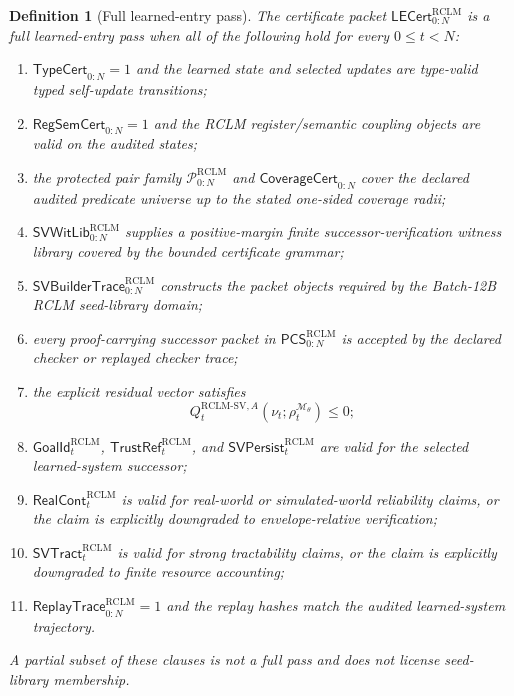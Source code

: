 \documentclass[11pt,a4paper]{article}
\newtheorem{definition}[theorem]{Definition}
\newcommand{\Pcal}{\mathcal P}
\newcommand{\RCLM}{\mathrm{RCLM}}
\begin{document}
\begin{definition}[Full learned-entry pass]
\label{def:rclm-m3min-full-learned-entry-pass}
The certificate packet $\mathsf{LECert}_{0:N}^{\RCLM}$ is a full learned-entry pass when all of the following hold for every $0\le t<N$:
\begin{enumerate}[label=(\roman*),leftmargin=1.5em]
    \item $\mathsf{TypeCert}_{0:N}=1$ and the learned state and selected updates are type-valid typed self-update transitions;
    \item $\mathsf{RegSemCert}_{0:N}=1$ and the RCLM register/semantic coupling objects are valid on the audited states;
    \item the protected pair family $\Pcal_{0:N}^{\RCLM}$ and $\mathsf{CoverageCert}_{0:N}$ cover the declared audited predicate universe up to the stated one-sided coverage radii;
    \item $\mathsf{SVWitLib}_{0:N}^{\RCLM}$ supplies a positive-margin finite successor-verification witness library covered by the bounded certificate grammar;
    \item $\mathsf{SVBuilderTrace}_{0:N}^{\RCLM}$ constructs the packet objects required by the Batch-12B RCLM seed-library domain;
    \item every proof-carrying successor packet in $\mathsf{PCS}_{0:N}^{\RCLM}$ is accepted by the declared checker or replayed checker trace;
    \item the explicit residual vector satisfies
    \[
    Q_t^{\RCLM\text{-}\mathrm{SV},A}(\nu_t;\rho_t^{\mathcal M_\theta})\le0;
    \]
    \item $\mathsf{GoalId}_t^{\RCLM}$, $\mathsf{TrustRef}_t^{\RCLM}$, and $\mathsf{SVPersist}_t^{\RCLM}$ are valid for the selected learned-system successor;
    \item $\mathsf{RealCont}_t^{\RCLM}$ is valid for real-world or simulated-world reliability claims, or the claim is explicitly downgraded to envelope-relative verification;
    \item $\mathsf{SVTract}_t^{\RCLM}$ is valid for strong tractability claims, or the claim is explicitly downgraded to finite resource accounting;
    \item $\mathsf{ReplayTrace}_{0:N}^{\RCLM}=1$ and the replay hashes match the audited learned-system trajectory.
\end{enumerate}
A partial subset of these clauses is not a full pass and does not license seed-library membership.
\end{definition}
\end{document}
